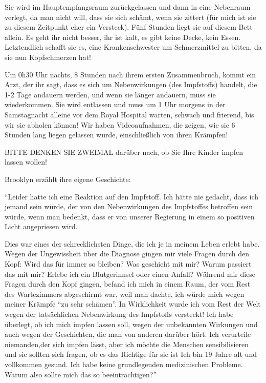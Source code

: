 Sie wird im Hauptempfangsraum zurückgelassen und dann in eine Nebenraum verlegt,
da man nicht will, dass sie sich schämt, wenn sie zittert (für mich ist sie zu
diesem Zeitpunkt eher ein Versteck). Fünf Stunden liegt sie auf diesem Bett
allein. Es geht ihr nicht besser, ihr ist kalt, es gibt keine Decke, kein
Essen. Letztendlich schafft sie es, eine Krankenschwester um Schmerzmittel zu
bitten, da sie nun Kopfschmerzen hat!

Um 0h30 Uhr nachts, 8 Stunden nach ihrem ersten Zusammenbruch, kommt ein Arzt,
der ihr sagt, dass es sich um Nebenwirkungen (des Impfstoffs) handelt, die 1-2
Tage andauern werden, und wenn sie länger andauern, muss sie wiederkommen. Sie
wird entlassen und muss um 1 Uhr morgens in der Samstagnacht alleine vor dem
Royal Hospital warten, schwach und frierend, bis wir sie abholen können! Wir
haben Videoaufnahmen, die zeigen, wie sie 6 Stunden lang liegen gelassen wurde,
einschließlich von ihren Krämpfen!

BITTE DENKEN SIE ZWEIMAL darüber nach, ob Sie Ihre Kinder impfen lassen wollen!

Brooklyn erzählt ihre eigene Geschichte:

“Leider hatte ich eine Reaktion auf den Impfstoff. Ich hätte nie gedacht, dass
ich jemand sein würde, der von den Nebenwirkungen des Impfstoffes betroffen sein
würde, wenn man bedenkt, dass er von unserer Regierung in einem so positiven
Licht angepriesen wird.

Dies war eines der schrecklichsten Dinge, die ich je in meinem Leben erlebt
habe. Wegen der Ungewissheit über die Diagnose gingen mir viele Fragen durch den
Kopf: Wird das für immer so bleiben? Was geschieht mit mir? Warum passiert das
mit mir? Erlebe ich ein Blutgerinnsel oder einen Anfall? Während mir diese
Fragen durch den Kopf gingen, befand ich mich in einem Raum, der vom Rest des
Wartezimmers abgeschirmt war, weil man dachte, ich würde mich wegen meiner
Krämpfe “zu sehr schämen”. In Wirklichkeit wurde ich vom Rest der Welt wegen der
tatsächlichen Nebenwirkung des Impfstoffs versteckt! Ich habe überlegt, ob ich
mich impfen lassen soll, wegen der unbekannten Wirkungen und auch wegen der
Geschichten, die man von anderen darüber hört. Ich verurteile niemanden,der sich
impfen lässt, aber ich möchte die Menschen sensibilisieren und sie sollten sich
fragen, ob es das Richtige für sie ist Ich bin 19 Jahre alt und vollkommen
gesund. Ich habe keine grundlegenden medizinischen Probleme. Warum also sollte
mich das so beeinträchtigen?”
